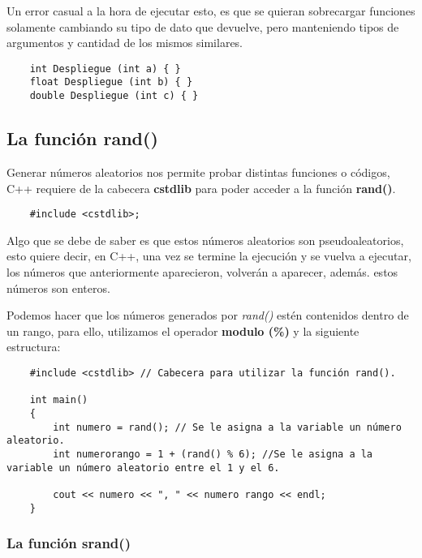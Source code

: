 Un error casual a la hora de ejecutar esto, es que se quieran sobrecargar funciones solamente cambiando su tipo de dato que devuelve, pero manteniendo tipos de argumentos y cantidad de los mismos similares.
\begin{lstlisting}
    int Despliegue (int a) { }
    float Despliegue (int b) { }
    double Despliegue (int c) { }
\end{lstlisting}


\subsection{La función rand()}

Generar números aleatorios nos permite probar distintas funciones o códigos, C++ requiere de la cabecera \textbf{cstdlib} para poder acceder a la función \textbf{rand()}.
\begin{lstlisting}
    #include <cstdlib>;
\end{lstlisting}

Algo que se debe de saber es que estos números aleatorios son pseudoaleatorios, esto quiere decir, en C++, una vez se termine la ejecución y se vuelva a ejecutar, los números que anteriormente aparecieron, volverán a aparecer, además. estos números son enteros.

Podemos hacer que los números generados por \textit{rand()} estén contenidos dentro de un rango, para ello, utilizamos el operador \textbf{modulo (\%)} y la siguiente estructura:
\begin{lstlisting}
    #include <cstdlib> // Cabecera para utilizar la función rand().
    
    int main()
    {
        int numero = rand(); // Se le asigna a la variable un número aleatorio.
        int numerorango = 1 + (rand() % 6); //Se le asigna a la variable un número aleatorio entre el 1 y el 6.
        
        cout << numero << ", " << numero rango << endl;
    }
\end{lstlisting}


\subsubsection{La función srand()}

